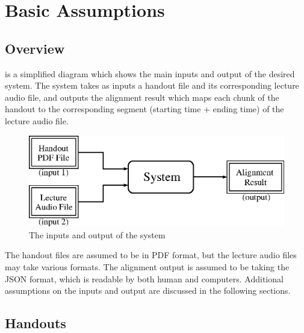 
\chapter{Basic Assumptions}
\label{chap:basic-assumptions}

\ifpdf
    \graphicspath{{Chapter2/Figs/Raster/}{Chapter2/Figs/PDF/}{Chapter2/Figs/}}
\else
    \graphicspath{{Chapter2/Figs/Vector/}{Chapter2/Figs/}}
\fi


\section{Overview}

 is a simplified diagram which shows the main inputs and output of the desired system. The system takes as inputs a handout file and its corresponding lecture audio file, and outputs the alignment result which maps each chunk of the handout to the corresponding segment (starting time + ending time) of the lecture audio file.

\begin{figure}[!hb]
  \centering
  \includegraphics[width=.75\textwidth]{sys-diagram.eps}
  \caption{The inputs and output of the system}
  \label{fig:sys-diagram-basic}
\end{figure}

The handout files are assumed to be in PDF format, but the lecture audio files may take various formats. The alignment output is assumed to be taking the JSON format, which is readable by both human and computers. Additional assumptions on the inputs and output are discussed in the following sections.


\section{Handouts}

